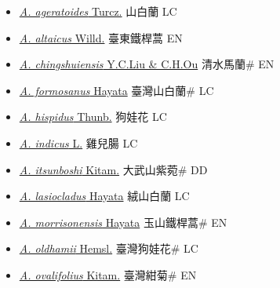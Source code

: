 \begin{itemize}
  \begin{itemize}
        \item[] \href{http://www.theplantlist.org/tpl1.1/search?q=Aster+ageratoides}{\textit{A. ageratoides} Turcz.}   山白蘭 LC
        \item[] \href{http://www.theplantlist.org/tpl1.1/search?q=Aster+altaicus}{\textit{A. altaicus} Willd.}   臺東鐵桿蒿 EN
        \item[] \href{http://www.theplantlist.org/tpl1.1/search?q=Aster+chingshuiensis}{\textit{A. chingshuiensis} Y.C.Liu \& C.H.Ou}   清水馬蘭\# EN
        \item[] \href{http://www.theplantlist.org/tpl1.1/search?q=Aster+formosanus}{\textit{A. formosanus} Hayata}   臺灣山白蘭\# LC
        \item[] \href{http://www.theplantlist.org/tpl1.1/search?q=Aster+hispidus}{\textit{A. hispidus} Thunb.}   狗娃花 LC
        \item[] \href{http://www.theplantlist.org/tpl1.1/search?q=Aster+indicus}{\textit{A. indicus} L.}   雞兒腸 LC
        \item[] \href{http://www.theplantlist.org/tpl1.1/search?q=Aster+itsunboshi}{\textit{A. itsunboshi} Kitam.}   大武山紫菀\# DD
        \item[] \href{http://www.theplantlist.org/tpl1.1/search?q=Aster+lasiocladus}{\textit{A. lasiocladus} Hayata}   絨山白蘭 LC
        \item[] \href{http://www.theplantlist.org/tpl1.1/search?q=Aster+morrisonensis}{\textit{A. morrisonensis} Hayata}   玉山鐵桿蒿\# EN
        \item[] \href{http://www.theplantlist.org/tpl1.1/search?q=Aster+oldhamii}{\textit{A. oldhamii} Hemsl.}   臺灣狗娃花\# LC
        \item[] \href{http://www.theplantlist.org/tpl1.1/search?q=Aster+ovalifolius}{\textit{A. ovalifolius} Kitam.}   臺灣紺菊\# EN

\end{itemize}
\end{itemize}
